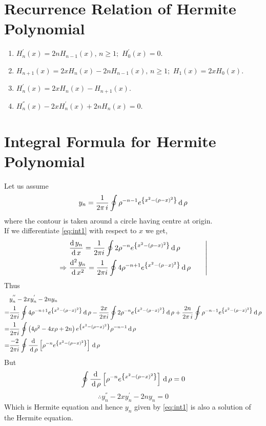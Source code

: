 \documentclass[../main-sheet.tex]{subfiles}
\begin{document}
\section{Recurrence Relation of Hermite Polynomial}
\begin{enumerate}[label={(\roman*)}]
    \item \( H_n^{'}(x)=2nH_{n-1}(x),\,n\geq1;\,\,H_0^{'}(x)=0 \).
    \item \( H_{n+1}(x)=2xH_{n}(x)-2nH_{n-1}(x),\,n\geq1;\,\,H_1(x)=2xH_0(x) \).
    \item \( H_n^{'}(x)=2xH_{n}(x)-H_{n+1}(x) \).
    \item \( H_n^{''}(x)-2xH_{n}^{'}(x)+2nH_{n}(x)=0 \).
\end{enumerate}
\section{Integral Formula for Hermite Polynomial}
Let us assume 
\begin{equation}
    y_n=\frac{1}{2\pi \,i} \oint \rho^{-n-1}e^{\left\{ x^2-(\rho-x)^2\right\}}\,\mathrm{d}\,\rho \label{eq:int1}
\end{equation}
where the contour is taken around a circle having centre at origin.\\
If we differentiate \eqref{eq:int1} with respect to \( x \) we get,
\[
    \left.\begin{aligned}
        & \,\frac{\mathrm{d}\,y_n}{\mathrm{d}\,x} =\frac{1}{2\pi i} \oint 2\rho^{-n}e^{\left\{ x^2-(\rho-x)^2\right\}}\,\mathrm{d}\,\rho\\
        \Rightarrow\,& \,\frac{\mathrm{d}^{2}\, y_n}{\mathrm{d}\, x^{2}} =\frac{1}{2\pi i} \oint 4 \rho^{-n+1}e^{\left\{ x^2-(\rho-x)^2\right\}}\,\mathrm{d}\,\rho
    \end{aligned}\qquad\right\vert
\]
Thus
\begin{align*}
    &y_n^{''}-2xy_n^{'}-2ny_n\\
    =& \frac{1}{2\pi i} \oint 4 \rho^{-n+1}e^{\left\{ x^2-(\rho-x)^2\right\}}\,\mathrm{d}\,\rho-\frac{2x}{2\pi i} \oint 2\rho^{-n}e^{\left\{ x^2-(\rho-x)^2\right\}}\,\mathrm{d}\,\rho+\frac{2n}{2\pi \,i} \oint \rho^{-n-1}e^{\left\{ x^2-(\rho-x)^2\right\}}\,\mathrm{d}\,\rho\\
    =& \frac{1}{2\pi i}\oint \left( 4\rho^2-4x\rho+2n \right)e^{\left\{ x^2-(\rho-x)^2\right\}} \rho^{-n-1}\,\mathrm{d}\,\rho\\
    =& \frac{-2}{2\pi i}\oint \frac{\,\mathrm{d}\,}{\,\mathrm{d}\,\rho}\left[ \rho^{-n} e^{\left\{ x^2-(\rho-x)^2\right\}}  \right]\,\mathrm{d}\,\rho
\end{align*}
But 
\[
    \oint \frac{\,\mathrm{d}\,}{\,\mathrm{d}\,\rho}\left[ \rho^{-n} e^{\left\{ x^2-(\rho-x)^2\right\}} \right]\,\mathrm{d}\,\rho=0
\]
\[
    \therefore y_n^{''}-2xy_n^{'}-2ny_n=0
\]
Which is Hermite equation and hence \( y_n \) given by \eqref{eq:int1} is also a solution of the Hermite equation.
\end{document}
